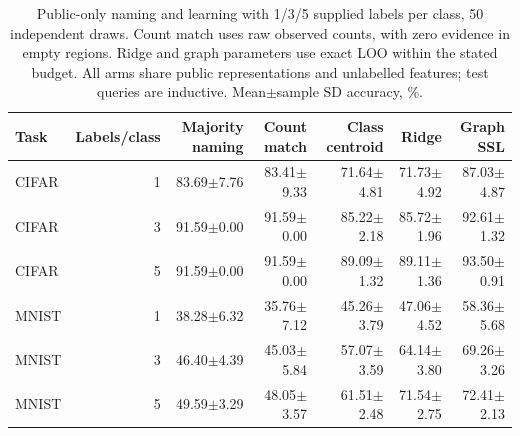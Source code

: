 \begin{table}[t]
\caption{Public-only naming and learning with 1/3/5 supplied labels per class, 50 independent draws. Count match uses raw observed counts, with zero evidence in empty regions. Ridge and graph parameters use exact LOO within the stated budget. All arms share public representations and unlabelled features; test queries are inductive. Mean$\pm$sample SD accuracy, \%.}
\label{tab:fewshot}\small
\centering
\begin{tabular}{@{}lrrrrrr@{}}\toprule
Task & Labels/class & Majority naming & Count match & Class centroid & Ridge & Graph SSL \\
\midrule
CIFAR & 1 & 83.69$\pm$7.76 & 83.41$\pm$9.33 & 71.64$\pm$4.81 & 71.73$\pm$4.92 & 87.03$\pm$4.87 \\
CIFAR & 3 & 91.59$\pm$0.00 & 91.59$\pm$0.00 & 85.22$\pm$2.18 & 85.72$\pm$1.96 & 92.61$\pm$1.32 \\
CIFAR & 5 & 91.59$\pm$0.00 & 91.59$\pm$0.00 & 89.09$\pm$1.32 & 89.11$\pm$1.36 & 93.50$\pm$0.91 \\
MNIST & 1 & 38.28$\pm$6.32 & 35.76$\pm$7.12 & 45.26$\pm$3.79 & 47.06$\pm$4.52 & 58.36$\pm$5.68 \\
MNIST & 3 & 46.40$\pm$4.39 & 45.03$\pm$5.84 & 57.07$\pm$3.59 & 64.14$\pm$3.80 & 69.26$\pm$3.26 \\
MNIST & 5 & 49.59$\pm$3.29 & 48.05$\pm$3.57 & 61.51$\pm$2.48 & 71.54$\pm$2.75 & 72.41$\pm$2.13 \\
\bottomrule\end{tabular}
\end{table}
